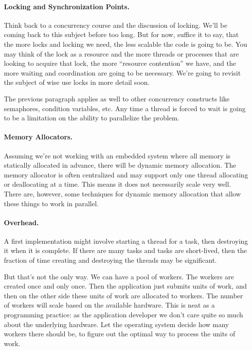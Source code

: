 \documentclass[a4paper]{report}
\begin{document}
\paragraph{Locking and Synchronization Points.}
Think back to a concurrency course and the discussion of locking. We'll be coming back to this subject before too long. But for now, suffice it to say, that the more locks and locking we need, the less scalable the code is going to be. You may think of the lock as a resource and the more threads or processes that are looking to acquire that lock, the more ``resource contention'' we have, and the more waiting and coordination are going to be necessary. We're going to revisit the subject of wise use locks in more detail soon.

The previous paragraph applies as well to other concurrency constructs like semaphores, condition variables, etc. Any time a thread is forced to wait is going to be a limitation on the ability to parallelize the problem.

\paragraph{Memory Allocators.}
Assuming we're not working with an embedded system where all memory is statically allocated in advance, there will be dynamic memory allocation. The memory allocator is often centralized and may support only one thread allocating or deallocating at a time. This means it does not necessarily scale very well. There are, however, some techniques for dynamic memory allocation that allow these things to work in parallel.

\paragraph{Overhead.}
A first implementation might involve starting a thread for a task, then destroying it when it is complete. If there are many tasks and tasks are short-lived, then the fraction of time creating and destroying the threads may be significant.

 But that's not the only way. We can have a pool of workers. The workers are created once and only once. Then the application just submits units of work, and then on the other side these units of work are allocated to workers. The number of workers will scale based on the available hardware. This is neat as a programming practice: as the application developer we don't care quite so much about the underlying hardware. Let the operating system decide how many workers there should be, to figure out the optimal way to process the units of work.
 
\end{document}
